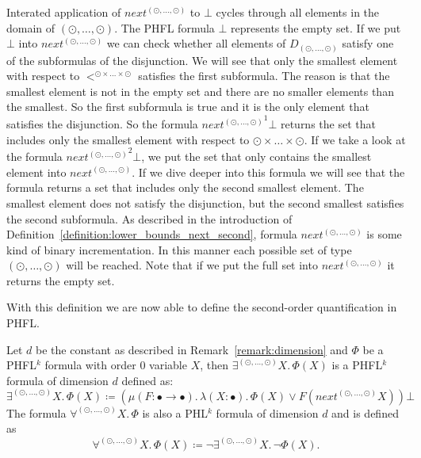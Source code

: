 \begin{remark}
\label{remark:lower_bounds_next_second}
	Interated application of $next^{(\odot, \dots, \odot)}$ to $\bot$ cycles through all elements in the domain of $(\odot, \dots, \odot)$. The PHFL formula $\bot$ represents the empty set. If we put $\bot$ into $next^{(\odot, \dots, \odot)}$ we can check whether all elements of $D_{(\odot, \dots, \odot)}$ satisfy one 
	of the subformulas of the disjunction. We will see that only the smallest element with respect to $<^{\odot\times\dots\times\odot}$ satisfies the first subformula. The reason is that the smallest element is not in the empty set and there are no smaller elements than the smallest.
	So the first subformula is true and it is the only element that satisfies the disjunction. So the formula ${next^{(\odot, \dots, \odot)}}^1 \bot$ returns the set that includes only the smallest 
	element with respect to $\odot \times \dots \times \odot$. If we take a look at the formula ${next^{(\odot, \dots, \odot)}}^2 \bot$, we put the set that only contains the smallest element into 
	$next^{(\odot, \dots, \odot)}$. If we dive deeper into this formula we will see that the formula returns a set that includes only the second smallest element. The smallest element does not 
	satisfy the disjunction, but the second smallest satisfies the second subformula. As described in the introduction of Definition~\ref{definition:lower_bounds_next_second}, formula $next^{(\odot, 
	\dots, \odot)}$ is some kind of binary incrementation. In this manner each possible set of type $(\odot, \dots, \odot)$ will be reached. Note that if we put the full set into $next^{(\odot, 
	\dots, \odot)}$ it returns the empty set.
\end{remark}

With this definition we are now able to define the second-order quantification in PHFL.

\begin{definition}
    \label{definition:existential_quantification_second}
    Let $d$ be the constant as described in Remark~\ref{remark:dimension} and $\Phi$ be a PHFL$^k$ formula with order $0$ variable $X$, then $\exists^{(\odot, \dots, \odot)}X .\,\Phi(X)$
    is a PHFL$^k$ formula of dimension $d$ defined as:
    \[\exists^{(\odot, \dots, \odot)}X.\, \Phi(X) \coloneqq (\mu (F \colon \bullet \rightarrow \bullet).\, \lambda (X
    \colon \bullet).\, \Phi(X) \vee F(next^{(\odot, \dots, \odot)} X)) \bot
    \]
    The formula $\forall^{(\odot, \dots, \odot)}X.\,\Phi$ is also a PHL$^k$ formula of dimension $d$ and is defined as
    \[\forall^{(\odot, \dots, \odot)}X.\,\Phi(X) \coloneqq \neg \exists^{(\odot, \dots, \odot)}X .\,\neg\Phi(X).\]
\end{definition}

